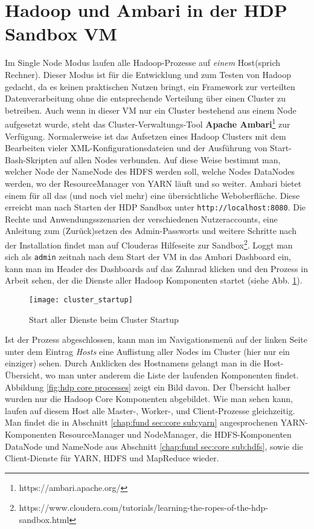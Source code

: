 \section{Hadoop und Ambari in der HDP Sandbox VM}
\label{chap:handson sec:ambari}
Im Single Node Modus laufen alle Hadoop-Prozesse auf \textit{einem} Host(sprich Rechner). Dieser Modus ist für die Entwicklung und zum Testen von Hadoop gedacht, da es keinen praktischen Nutzen bringt, ein Framework zur verteilten Datenverarbeitung ohne die entsprechende Verteilung über einen Cluster zu betreiben. Auch wenn in dieser VM nur ein Cluster bestehend aus einem Node aufgesetzt wurde, steht das Cluster-Verwaltungs-Tool \textbf{Apache Ambari}\footnote{https://ambari.apache.org/} zur Verfügung. Normalerweise ist das Aufsetzen eines Hadoop Clusters mit dem Bearbeiten vieler XML-Konfigurationsdateien und der Ausführung von Start-Bash-Skripten auf allen Nodes verbunden. Auf diese Weise bestimmt man, welcher Node der NameNode des HDFS werden soll, welche Nodes DataNodes werden, wo der ResourceManager von YARN läuft und so weiter. Ambari bietet einem für all das (und noch viel mehr) eine übersichtliche Weboberfläche. Diese erreicht man nach Starten der HDP Sandbox unter \verb|http://localhost:8080|. Die Rechte und Anwendungsszenarien der verschiedenen Nutzeraccounts, eine Anleitung zum (Zurück)setzen des Admin-Passworts und weitere Schritte nach der Installation findet man auf Clouderas Hilfeseite zur Sandbox\footnote{https://www.cloudera.com/tutorials/learning-the-ropes-of-the-hdp-sandbox.html}. Loggt man sich als \verb|admin| zeitnah nach dem Start der VM in das Ambari Dashboard ein, kann man im Header des Dashboards auf das Zahnrad klicken und den Prozess in Arbeit sehen, der die Dienste aller Hadoop Komponenten startet (siehe Abb. \ref{fig:cluster startup}). 

\begin{figure}[ht]
    \centering
    \texttt{[image: cluster\_startup]}
    \caption[Start aller Prozesse beim Cluster Startup]{Start aller Dienste beim Cluster Startup}
    \label{fig:cluster startup}
\end{figure}

Ist der Prozess abgeschlossen, kann man im Navigationsmenü auf der linken Seite unter dem Eintrag \textit{Hosts} eine Auflistung aller Nodes im Cluster (hier nur ein einziger) sehen. Durch Anklicken des Hostnamens gelangt man in die Host-Übersicht, wo man unter anderem die Liste der laufenden Komponenten findet. Abbildung \ref{fig:hdp core processes} zeigt ein Bild davon. Der Übersicht halber wurden nur die Hadoop Core Komponenten abgebildet. Wie man sehen kann, laufen auf diesem Host alle Master-, Worker-, und Client-Prozesse gleichzeitig. Man findet die in Abschnitt \ref{chap:fund sec:core sub:yarn} angesprochenen YARN-Komponenten ResourceManager und NodeManager, die HDFS-Komponenten DataNode und NameNode aus Abschnitt \ref{chap:fund sec:core sub:hdfs}, sowie die Client-Dienste für YARN, HDFS und MapReduce wieder. 

